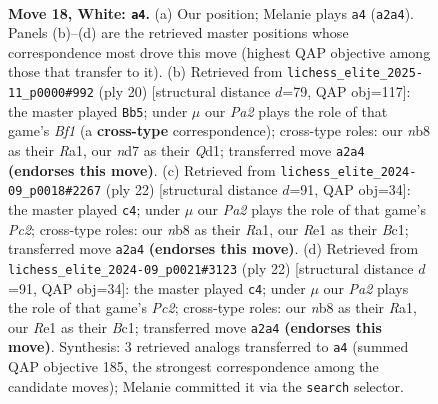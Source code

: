 \documentclass[11pt]{article}
\begin{document}
\clearpage

\begin{figure}[p]\centering
\begin{subfigure}{0.46\textwidth}\centering
\resizebox{\linewidth}{!}{%
\newchessgame
\chessboard[
  setfen={rnb1r3/3nq1kp/pp2p1p1/2ppP3/8/2N5/PPPQ1PPP/1K2RBNR w - - 0 18},
  showmover=false,
  pgfstyle=straightmove, color=movearrow, markmove={a2-a4}
]}
\caption{}
\end{subfigure}\hfill
\begin{subfigure}{0.46\textwidth}\centering
\resizebox{\linewidth}{!}{%
\newchessgame
\chessboard[
  setfen={r1b1k2r/ppq1nppp/2n1p3/3pP3/1P1p1B2/P4N2/2P2PPP/R2QKB1R w KQkq - 2 11},
  showmover=false,
  pgfstyle=straightmove, color=movearrow, markmove={f1-b5}
]}
\caption{}
\end{subfigure}
\\[4pt]
\begin{subfigure}{0.46\textwidth}\centering
\resizebox{\linewidth}{!}{%
\newchessgame
\chessboard[
  setfen={3qkb1r/4nppp/r1p1p3/p2pP3/8/5N2/PPP2PPP/R1BQ1RK1 w k - 0 12},
  showmover=false,
  pgfstyle=straightmove, color=movearrow, markmove={c2-c4}
]}
\caption{}
\end{subfigure}\hfill
\begin{subfigure}{0.46\textwidth}\centering
\resizebox{\linewidth}{!}{%
\newchessgame
\chessboard[
  setfen={3qkb1r/4nppp/r1p1p3/p2pP3/8/5N2/PPP2PPP/R1BQ1RK1 w k - 0 12},
  showmover=false,
  pgfstyle=straightmove, color=movearrow, markmove={c2-c4}
]}
\caption{}
\end{subfigure}
\caption{\textbf{Move 18, White: \texttt{a4}.} (a) Our position; Melanie plays \texttt{a4} (\texttt{a2a4}). Panels (b)--(d) are the retrieved master positions whose correspondence most drove this move (highest QAP objective among those that transfer to it). (b) Retrieved from \texttt{lichess\_elite\_2025-11\_p0000\#992} (ply 20) [structural distance $d$=79, QAP obj=117]: the master played \texttt{Bb5}; under $\mu$ our \emph{Pa2} plays the role of that game's \emph{Bf1} (a \textbf{cross-type} correspondence); cross-type roles: our \emph{n}b8 as their \emph{R}a1, our \emph{n}d7 as their \emph{Q}d1; transferred move \texttt{a2a4} \textbf{(endorses this move)}. (c) Retrieved from \texttt{lichess\_elite\_2024-09\_p0018\#2267} (ply 22) [structural distance $d$=91, QAP obj=34]: the master played \texttt{c4}; under $\mu$ our \emph{Pa2} plays the role of that game's \emph{Pc2}; cross-type roles: our \emph{n}b8 as their \emph{R}a1, our \emph{R}e1 as their \emph{B}c1; transferred move \texttt{a2a4} \textbf{(endorses this move)}. (d) Retrieved from \texttt{lichess\_elite\_2024-09\_p0021\#3123} (ply 22) [structural distance $d$=91, QAP obj=34]: the master played \texttt{c4}; under $\mu$ our \emph{Pa2} plays the role of that game's \emph{Pc2}; cross-type roles: our \emph{n}b8 as their \emph{R}a1, our \emph{R}e1 as their \emph{B}c1; transferred move \texttt{a2a4} \textbf{(endorses this move)}. Synthesis: 3 retrieved analogs transferred to \texttt{a4} (summed QAP objective 185, the strongest correspondence among the candidate moves); Melanie committed it via the \texttt{search} selector.}
\label{fig:thought-m34}
\end{figure}
\end{document}
